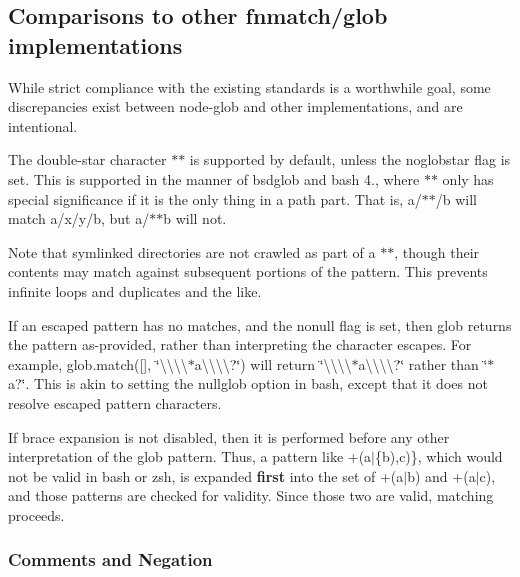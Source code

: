 \subsection*{Comparisons to other fnmatch/glob implementations}

While strict compliance with the existing standards is a worthwhile goal, some discrepancies exist between node-\/glob and other implementations, and are intentional.

The double-\/star character {\ttfamily $\ast$$\ast$} is supported by default, unless the {\ttfamily noglobstar} flag is set. This is supported in the manner of bsdglob and bash 4., where {\ttfamily $\ast$$\ast$} only has special significance if it is the only thing in a path part. That is, {\ttfamily a/$\ast$$\ast$/b} will match {\ttfamily a/x/y/b}, but {\ttfamily a/$\ast$$\ast$b} will not.

Note that symlinked directories are not crawled as part of a {\ttfamily $\ast$$\ast$}, though their contents may match against subsequent portions of the pattern. This prevents infinite loops and duplicates and the like.

If an escaped pattern has no matches, and the {\ttfamily nonull} flag is set, then glob returns the pattern as-\/provided, rather than interpreting the character escapes. For example, {\ttfamily glob.\+match(\mbox{[}\mbox{]}, \char`\"{}\textbackslash{}\textbackslash{}\textbackslash{}\textbackslash{}$\ast$a\textbackslash{}\textbackslash{}\textbackslash{}\textbackslash{}?\char`\"{})} will return {\ttfamily \char`\"{}\textbackslash{}\textbackslash{}\textbackslash{}\textbackslash{}$\ast$a\textbackslash{}\textbackslash{}\textbackslash{}\textbackslash{}?\char`\"{}} rather than {\ttfamily \char`\"{}$\ast$a?\char`\"{}}. This is akin to setting the {\ttfamily nullglob} option in bash, except that it does not resolve escaped pattern characters.

If brace expansion is not disabled, then it is performed before any other interpretation of the glob pattern. Thus, a pattern like {\ttfamily +(a$\vert$\{b),c)\}}, which would not be valid in bash or zsh, is expanded {\bfseries first} into the set of {\ttfamily +(a$\vert$b)} and {\ttfamily +(a$\vert$c)}, and those patterns are checked for validity. Since those two are valid, matching proceeds.

\subsubsection*{Comments and Negation}

